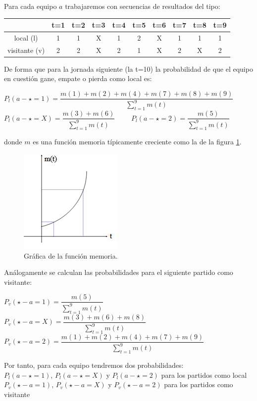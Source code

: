 Para cada equipo $a$ trabajaremos con secuencias de resultados del tipo:
\begin{center}
	\begin{tabular}{|c|c|c|c|c|c|c|c|c|c|}
	\hline  & t=1 & t=2 & t=3 & t=4 & t=5 & t=6 & t=7 & t=8 & t=9 \\ 
	\hline local (l)  & 1 & 1 & X & 1 & 2 & X & 1 & 1 & 1 \\ 
	\hline visitante (v) & 2 & 2 & X & 2 & 1 & X & 2 & X & 2 \\ 
	\hline 
	\end{tabular} 
\end{center}
De forma que para la jornada siguiente (la t=10) la probabilidad de que el equipo en cuestión gane, empate o pierda como local es:
\begin{center}
$P_{l}(a - \star=1)=\dfrac{m(1)+m(2)+m(4)+m(7)+m(8)+m(9)}{\sum_{t=1}^{9}m(t)}$\\
$P_{l}(a - \star=X)=\dfrac{m(3)+m(6)}{\sum_{t=1}^{9}m(t)}$ \ \ \ \
$P_{l}(a - \star=2)=\dfrac{m(5)}{\sum_{t=1}^{9}m(t)}$
\end{center}
donde $m$ es una función memoria típicamente creciente como la de la figura \ref{fig:memoria}.

\begin{figure}[htb]
	\centering
	\includegraphics{images/memoria.jpg}
	\caption{Gráfica de la función memoria.} \label{fig:memoria}
\end{figure}
Análogamente se calculan las probabilidades para el siguiente partido como visitante:
\begin{center}
	$P_{v}(\star - a=1)=\dfrac{m(5)}{\sum_{t=1}^{9}m(t)}$ \ \ \ \
	$P_{v}(\star - a=X)=\dfrac{m(3)+m(6)+m(8)}{\sum_{t=1}^{9}m(t)}$\\
	$P_{v}(\star - a=2)=\dfrac{m(1)+m(2)+m(4)+m(7)+m(9)}{\sum_{t=1}^{9}m(t)}$
\end{center}

Por tanto, para cada equipo tendremos dos probabilidades:\\
$P_{l}(a - \star=1)$, $P_{l}(a - \star=X)$ y $P_{l}(a - \star=2)$ para los partidos como local \\
$P_{v}(\star - a=1)$, $P_{v}(\star - a=X)$ y $P_{v}(\star - a=2)$ para los partidos como visitante\\

